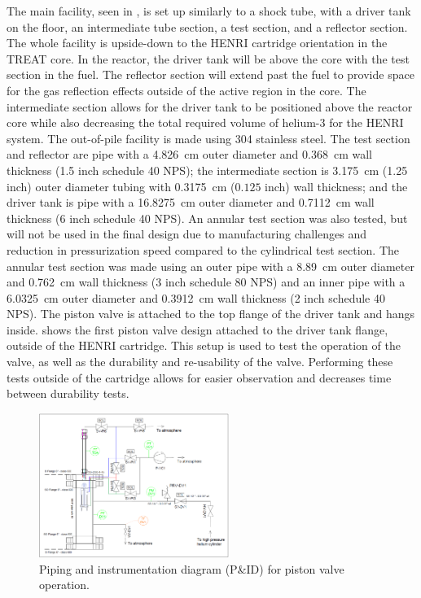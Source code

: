 The main facility, seen in , is set up similarly to a shock tube, with a driver tank on the floor, an intermediate tube section, a test section, and a reflector section.
The whole facility is upside-down to the HENRI cartridge orientation in the TREAT core.
In the reactor, the driver tank will be above the core with the test section in the fuel.
The reflector section will extend past the fuel to provide space for the gas reflection effects outside of the active region in the core.
The intermediate section allows for the driver tank to be positioned above the reactor core while also decreasing the total required volume of helium-3 for the HENRI system.
The out-of-pile facility is made using 304 stainless steel.
The test section and reflector are pipe with a \SI{4.826}{\centi\meter} outer diameter and \SI{0.368}{\centi\meter} wall thickness (1.5 inch schedule 40 NPS); the intermediate section is \SI{3.175}{\centi\meter} (1.25 inch) outer diameter tubing with \SI{0.3175}{\centi\meter} ($0.125$ inch) wall thickness; and the driver tank is pipe with a \SI{16.8275}{\centi\meter} outer diameter and \SI{0.7112}{\centi\meter} wall thickness (6 inch schedule 40 NPS).
An annular test section was also tested, but will not be used in the final design due to manufacturing challenges and reduction in pressurization speed compared to the cylindrical test section. The annular test section was made using an outer pipe with a \SI{8.89}{\centi\meter} outer diameter and \SI{0.762}{\centi\meter} wall thickness (3 inch schedule 80 NPS) and an inner pipe with a \SI{6.0325}{\centi\meter} outer diameter and \SI{0.3912}{\centi\meter} wall thickness (2 inch schedule 40 NPS).
The piston valve is attached to the top flange of the driver tank and hangs inside.  shows the first piston valve design attached to the driver tank flange, outside of the HENRI cartridge.
This setup is used to test the operation of the valve, as well as the durability and re-usability of the valve.
Performing these tests outside of the cartridge allows for easier observation and decreases time between durability tests.


%
\begin{figure}[tb]
    \vspace{16pt}
    \centering
    \includegraphics[width=0.55\textwidth]{experiment/photos/HENRI_valve_PID.PNG}
    \caption{Piping and instrumentation diagram (P\&ID) for piston valve operation.}
    \label{fig:sv pid}
    \vspace{16pt}
\end{figure}
%


